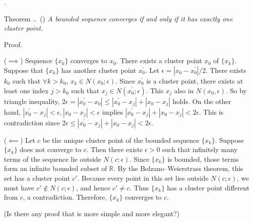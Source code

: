 \documentclass[8pt]{beamer}
\newcounter{thm}
\newcounter{ex}
\renewcommand{\thethm}{\thesection.\thesubsection.\arabic{thm}}
\renewenvironment{theorem}[1][]{%
    \refstepcounter{thm}%
    \begin{block}{Theorem \thethm\if\relax\detokenize{#1}\relax\else\ (#1)\fi}%
    \itshape
}{%
    \end{block}%
}
\newcommand{\abs}[1]{\left\lvert #1 \right\rvert}
\begin{document}
\begin{frame}{.}
    \begin{theorem} \label{th:1.3.14}
        A bounded sequence converges if and only if it has exactly one cluster point.

        Proof.

        ($\implies$) Sequence $\{x_k\}$ converges to $x_0$.
        There exists a  cluster point $x_0$ of $\{x_k\}$.
        Suppose that $\{x_k\}$ has another cluster point $x_0^\prime$.
        Let $\epsilon = \abs{x_0 - x_0^\prime}/2$.
        There exists $k_0$ such that $\forall k >k_0$, $x_k \in N(x_0; \epsilon)$.
        Since $x^\prime_0$ is a cluster point, there exists at least one index $j > k_0$ such that $x_j \in N(x_0^\prime; \epsilon)$.
        This $x_j$ also in $N(x_0, \epsilon)$. So by triangle inequality, $2 \epsilon = \abs{x_0^\prime - x_0} \leq \abs{x_0^\prime - x_j} + \abs{x_0 - x_j}$ holds.
        On the other hand, $\abs{x_0^\prime - x_j} < \epsilon, \abs{x_0 - x_j} < \epsilon$ implies $\abs{x_0^\prime - x_j} + \abs{x_0 - x_j} < 2 \epsilon$.
        This is contradiction since $2 \epsilon \leq \abs{x_0^\prime - x_j} + \abs{x_0 - x_j} < 2 \epsilon$.

        \smallskip
        ($\impliedby$) Let $c$ be the unique cluster point of the bounded sequence $\{x_k\}$.
        Suppose $\{x_k\}$ does not converge to $c$.
        Then there exists $\epsilon>0$ such that infinitely many terms of the sequence lie outside $N(c;\epsilon)$.
        Since $\{x_k\}$ is bounded, those terms form an infinite bounded subset of $\mathbb{R}$.
        By the Bolzano--Weierstrass theorem, this set has a cluster point $c'$.
        Because every point in this set lies outside $N(c;\epsilon)$, we must have $c' \notin N(c;\epsilon)$, and hence $c' \ne c$.
        Thus $\{x_k\}$ has a cluster point different from $c$, a contradiction.
        Therefore, $\{x_k\}$ converges to $c$.

        \bigskip
        (Is there any proof that is more simple and more elegant?)
    \end{theorem}
\end{frame}
\end{document}
